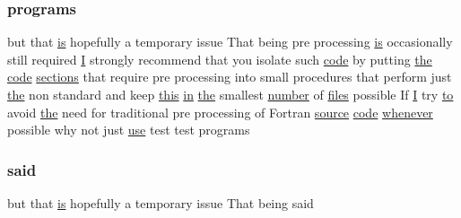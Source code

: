 \subsubsection{\texorpdfstring{programs}{programs}}
{\footnotesize\ttfamily but that \hyperlink{intro__blas1_83_8txt_a42a91df93f840595de3019ceb5d1df23}{is} hopefully a temporary issue That being pre processing \hyperlink{intro__blas1_83_8txt_a42a91df93f840595de3019ceb5d1df23}{is} occasionally still required \hyperlink{continue_87_8txt_ae7b8826453d28f1bdb2fba7e889eb23b}{I} strongly recommend that you isolate such \hyperlink{ufpp__overview_81_8txt_a74a0615f2d9c4a398d9126096f8092f8}{code} by putting \hyperlink{M__stopwatch_83_8txt_a0f266597de2e57eb3aa964927bb30e14}{the} \hyperlink{ufpp__overview_81_8txt_a74a0615f2d9c4a398d9126096f8092f8}{code} \hyperlink{intro__blas1_83_8txt_aa06cca0b542e18027a508f939187fc96}{sections} that require pre processing into small procedures that perform just \hyperlink{M__stopwatch_83_8txt_a0f266597de2e57eb3aa964927bb30e14}{the} non standard and keep \hyperlink{M__stopwatch_83_8txt_ad62a52042bb610eee5b36b5516caec22}{this} \hyperlink{M__journal_83_8txt_afce72651d1eed785a2132bee863b2f38}{in} \hyperlink{M__stopwatch_83_8txt_a0f266597de2e57eb3aa964927bb30e14}{the} smallest \hyperlink{what__overview_81_8txt_a3b215423c351b7d527eb75d2456331cf}{number} of \hyperlink{ufpp__overview_81_8txt_a5673f2294ff1627be40c90eae33141ca}{files} possible If \hyperlink{continue_87_8txt_ae7b8826453d28f1bdb2fba7e889eb23b}{I} try \hyperlink{M__stopwatch_83_8txt_a97209fd3e34ef701c0a9734280779cbb}{to} avoid \hyperlink{M__stopwatch_83_8txt_a0f266597de2e57eb3aa964927bb30e14}{the} need for traditional pre processing of Fortran \hyperlink{ufpp__overview_81_8txt_a4d6669ece605d05985c83a04dd38e0ad}{source} \hyperlink{ufpp__overview_81_8txt_a74a0615f2d9c4a398d9126096f8092f8}{code} \hyperlink{do_87_8txt_a810fd937840b16353708346232656a5f}{whenever} possible why not just \hyperlink{intro__blas1_83_8txt_a04fa2694d85f67a675bb3f45f7241f48}{use} test test programs}

\mbox{\label{ufpp__overview_81_8txt_a7f6c233b45fc747402eec6ec7e1e89fc}} 
\subsubsection{\texorpdfstring{said}{said}}
{\footnotesize\ttfamily but that \hyperlink{intro__blas1_83_8txt_a42a91df93f840595de3019ceb5d1df23}{is} hopefully a temporary issue That being said}

